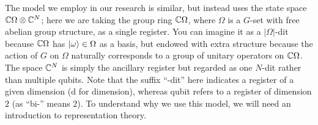 \documentclass[12pt,twoside]{reedthesis}
\theoremstyle{plain}   %
\theoremstyle{definition}
\theoremstyle{remark}
\numberwithin{equation}{section}
\begin{document}


  

  The model we employ in our research is similar, but instead uses the state space $\mathbb{C}\Omega \otimes \mathbb{C}^N$; here we are taking the group ring $\mathbb{C} \Omega$, where $\Omega$ is a $G$-set with free abelian group structure,
  as a single register. You can imagine it as a $|\Omega|$-dit because $\mathbb{C}\Omega$ has $\ket{\omega} \in \Omega$ as a basis, but endowed with extra structure because the action of $G$ on $\Omega$ naturally corresponds
  to a group of unitary operators on $\mathbb{C}\Omega$. The space $\mathbb{C}^N$ is simply the ancillary register but regarded as one $N$-dit rather than multiple qubits. Note that the suffix ``-dit'' here indicates a register of a given dimension
  (d for dimension),
  whereas qubit refers to a register of dimension $2$ (as ``bi-'' means $2$).
  To understand why we use this model, we will need an introduction to representation theory.
\end{document}
